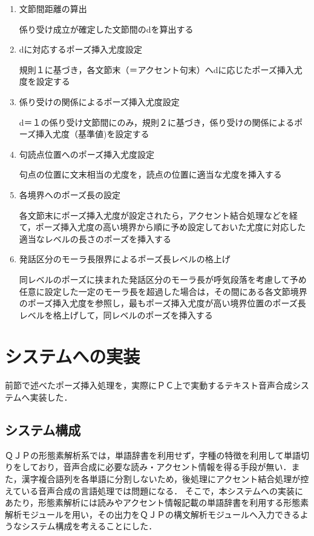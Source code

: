 \begin{enumerate}

	\item 文節間距離の算出

		係り受け成立が確定した文節間のdを算出する

	\item dに対応するポーズ挿入尤度設定

		規則１に基づき，各文節末（＝アクセント句末）へdに応じたポーズ挿入尤度を設定する

	\item 係り受けの関係によるポーズ挿入尤度設定

		d＝１の係り受け文節間にのみ，規則２に基づき，係り受けの関係によるポーズ挿入尤度（基準値)を設定する

	\item 句読点位置へのポーズ挿入尤度設定

		句点の位置に文末相当の尤度を，読点の位置に適当な尤度を挿入する

	\item 各境界へのポーズ長の設定

		各文節末にポーズ挿入尤度が設定されたら，アクセント結合処理などを経て，ポーズ挿入尤度の高い境界から順に予め設定しておいた尤度に対応した適当なレベルの長さのポーズを挿入する
	
	\item 発話区分のモーラ長限界によるポーズ長レベルの格上げ

		同レベルのポーズに挟まれた発話区分のモーラ長が呼気段落を考慮して予め任意に設定した一定のモーラ長を超過した場合は，その間にある各文節境界のポーズ挿入尤度を参照し，最もポーズ挿入尤度が高い境界位置のポーズ長レベルを格上げして，同レベルのポーズを挿入する

\end{enumerate}

\section{システムへの実装}\label{sec:coding}

前節で述べたポーズ挿入処理を，実際にＰＣ上で実動するテキスト音声合成システムへ実装した．

\subsection{システム構成}

ＱＪＰの形態素解析系では，単語辞書を利用せず，字種の特徴を利用して単語切りをしており，音声合成に必要な読み・アクセント情報を得る手段が無い．また，漢字複合語列を各単語に分割しないため，後処理にアクセント結合処理が控えている音声合成の言語処理では問題になる．
そこで，本システムへの実装にあたり，形態素解析には読みやアクセント情報記載の単語辞書を利用する形態素解析モジュールを用い，その出力をＱＪＰの構文解析モジュールへ入力できるようなシステム構成を考えることにした．

